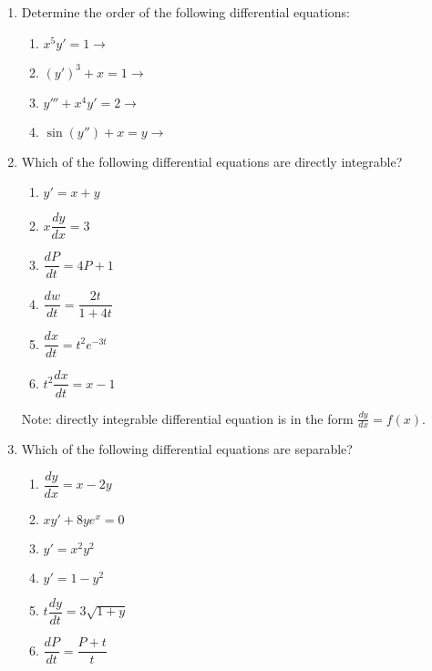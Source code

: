 \documentclass{nosvagor-notes}
\begin{document}
\begin{enumerate}
  \item Determine the order of the following differential equations:
    \begin{multicols}{2}
      \begin{enumerate}
        \item \(x^5y'=1 \to\) 
        \item \((y')^3+x=1 \to \) 
        \item \(y''' + x^4y' = 2 \to\) 
        \item \(\sin (y'') + x = y \to \) 
      \end{enumerate}
    \end{multicols}
    \vspace{80pt}

  \item Which of the following differential equations are directly integrable?
  \begin{multicols}{2}
    \begin{enumerate}
      \item \(y'=x+y\) 
      \item \(x \dfrac{dy}{dx} = 3\) 
      \item \(\dfrac{dP}{dt} = 4P + 1\) 
      \item \(\dfrac{dw}{dt} = \dfrac{2t}{1+4t}\) 
      \item \(\dfrac{dx}{dt} = t^2 e^{-3t}\) 
      \item \(t^2 \dfrac{dx}{dt} = x - 1\) 
    \end{enumerate}
  \end{multicols}

  Note: directly integrable differential equation is in the form \(\frac{dy}{dx} = f(x)\).

  \newpage

  \item Which of the following differential equations are separable?
  \begin{multicols}{2}
    \begin{enumerate}
      \item \(\dfrac{dy}{dx} = x - 2y\) 
      \item \(xy' + 8ye^x = 0\) 
      \item \(y' = x^2y^2\) 
      \item \(y' = 1-y^2\) 
      \item \(t \dfrac{dy}{dt} = 3 \sqrt{1+y} \) 
      \item \(\dfrac{dP}{dt} = \dfrac{P+t}{t}\) 
    \end{enumerate}
  \end{multicols}
  \vspace{256pt}


\end{enumerate}
\end{document}
